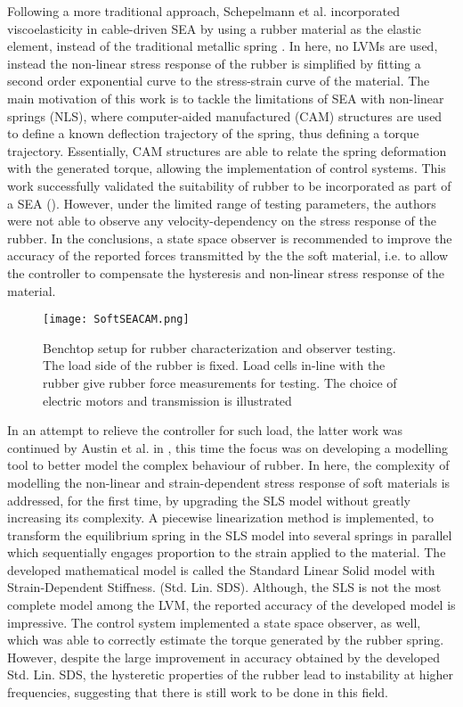 Following a more traditional approach, Schepelmann et al. incorporated viscoelasticity in cable-driven SEA by using a rubber material as the elastic element, instead of the traditional metallic spring \cite{schepelmann2014compact}. In here, no LVMs are used, instead the non-linear stress response of the rubber is simplified by fitting a second order exponential curve to the stress-strain curve of the material. The main motivation of this work is to tackle the limitations of SEA with non-linear springs (NLS), where computer-aided manufactured (CAM) structures are used to define a known deflection trajectory of the spring, thus defining a torque trajectory. Essentially, CAM structures are able to relate the spring deformation with the generated torque, allowing the implementation of control systems. This work successfully validated the suitability of rubber to be incorporated as part of a SEA (). However, under the limited range of testing parameters, the authors were not able to observe any velocity-dependency on the stress response of the rubber. In the conclusions, a state space observer is recommended to improve the accuracy of the reported forces transmitted by the the soft material, i.e. to allow the controller to compensate the hysteresis and non-linear stress response of the material.

\begin{figure}[htb!]
    \centering
    \texttt{[image: SoftSEACAM.png]}
    \caption{Benchtop setup for rubber characterization and observer testing. The load side of the rubber is fixed. Load cells in-line with the rubber give rubber force measurements for testing. The choice of electric motors and transmission is illustrated \cite{schepelmann2014compact}}
    \label{fig:softSEACAM}
\end{figure}

In an attempt to relieve the controller for such load, the latter work was continued by Austin et al. in \cite{austin2015control}, this time the focus was on developing a modelling tool to better model the complex behaviour of rubber. In here, the complexity of modelling the non-linear and strain-dependent stress response of soft materials is addressed, for the first time, by upgrading the SLS model without greatly increasing its complexity. A piecewise linearization method is implemented, to transform the equilibrium spring in the SLS model into several springs in parallel which sequentially engages proportion to the strain applied to the material. The developed mathematical model is called the Standard Linear Solid model with Strain-Dependent Stiffness. (Std. Lin. SDS). Although, the SLS is not the most complete model among the LVM, the reported accuracy of the developed model is impressive. The control system implemented a state space observer, as well, which was able to correctly estimate the torque generated by the rubber spring. However, despite the large improvement in accuracy obtained by the developed Std. Lin. SDS, the hysteretic properties of the rubber  lead to instability at higher frequencies, suggesting that there is still work to be done in this field.

